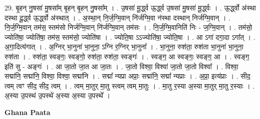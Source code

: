 \documentclass[17pt]{extarticle}
\begin{document}
29. बृ॒हन् नु॒षसा॑ मु॒षसा᳚म् बृ॒हन् बृ॒हन् नु॒षसा᳚म् । . उ॒षसा॑ मू॒र्द्ध्व ऊ॒र्द्ध्व उ॒षसा॑ मु॒षसा॑ मू॒र्द्ध्वः । . ऊ॒र्द्ध्वो अ॑स्था दस्था दू॒र्द्ध्व ऊ॒र्द्ध्वो अ॑स्थात् । . अ॒स्था॒न् नि॒र्ज॒ग्मि॒वान् नि॑र्जग्मि॒वा न॑स्था दस्थान् निर्जग्मि॒वान् । . नि॒र्ज॒ग्मि॒वान् तम॑स॒ स्तम॑सो निर्जग्मि॒वान् नि॑र्जग्मि॒वान् तम॑सः । . नि॒र्ज॒ग्मि॒वानिति॑ निः - ज॒ग्मि॒वान् । . तम॑सो॒ ज्योति॑षा॒ ज्योति॑षा॒ तम॑स॒ स्तम॑सो॒ ज्योति॑षा । . ज्योति॒षा ऽऽज्योति॑षा॒ ज्योति॒षा । . आ ऽगा॑ दगा॒दा ऽगा᳚त् । . अ॒गा॒दित्य॑गात् । . अ॒ग्निर् भा॒नुना॑ भा॒नुना॒ ऽग्नि र॒ग्निर् भा॒नुना᳚ । . भा॒नुना॒ रुश॑ता॒ रुश॑ता भा॒नुना॑ भा॒नुना॒ रुश॑ता । . रुश॑ता॒ स्वङ्गः॒ स्वङ्गो॒ रुश॑ता॒ रुश॑ता॒ स्वङ्गः॑ । . स्वङ्ग॒ आ स्वङ्गः॒ स्वङ्ग॒ आ । . स्वङ्ग॒ इति॑ सु - अङ्गः॑ । . आ जा॒तो जा॒त आ जा॒तः । . जा॒तो विश्वा॒ विश्वा॑ जा॒तो जा॒तो विश्वा᳚ । . विश्वा॒ सद्मा॑नि॒ सद्मा॑नि॒ विश्वा॒ विश्वा॒ सद्मा॑नि । . सद्मा᳚ न्यप्रा अप्राः॒ सद्मा॑नि॒ सद्मा᳚ न्यप्राः । . अ॒प्रा॒ इत्य॑प्राः । . सीद॒ त्वम् त्वꣳ सीद॒ सीद॒ त्वम् । . त्वम् मा॒तुर् मा॒तु स्त्वम् त्वम् मा॒तुः । . मा॒तु र॒स्या अ॒स्या मा॒तुर् मा॒तु र॒स्याः । . अ॒स्या उ॒पस्थ॑ उ॒पस्थे॑ अ॒स्या अ॒स्या उ॒पस्थे᳚ । \newline

\textbf{Ghana Paata } \newline
\end{document}
